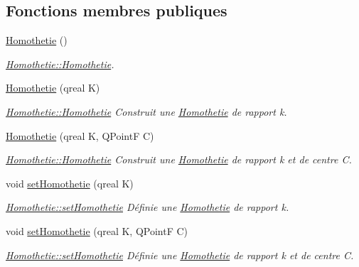 \subsection*{Fonctions membres publiques}
\begin{DoxyCompactItemize}
\item 
\hyperlink{class_homothetie_a0c2ab7e4afc80bf76f10d6cecc2891fe}{Homothetie} ()
\begin{DoxyCompactList}\small\item\em \hyperlink{class_homothetie_a0c2ab7e4afc80bf76f10d6cecc2891fe}{Homothetie\+::\+Homothetie}. \end{DoxyCompactList}\item 
\hyperlink{class_homothetie_ab9e23a5bfa3141fde6951a4eec5cbe6e}{Homothetie} (qreal K)
\begin{DoxyCompactList}\small\item\em \hyperlink{class_homothetie_a0c2ab7e4afc80bf76f10d6cecc2891fe}{Homothetie\+::\+Homothetie} Construit une \hyperlink{class_homothetie}{Homothetie} de rapport k. \end{DoxyCompactList}\item 
\hyperlink{class_homothetie_a18b4271dabd8771540007efe8389827a}{Homothetie} (qreal K, Q\+Point\+F C)
\begin{DoxyCompactList}\small\item\em \hyperlink{class_homothetie_a0c2ab7e4afc80bf76f10d6cecc2891fe}{Homothetie\+::\+Homothetie} Construit une \hyperlink{class_homothetie}{Homothetie} de rapport k et de centre C. \end{DoxyCompactList}\item 
void \hyperlink{class_homothetie_aa522cc6acd7c5822a67dde17e406da3c}{set\+Homothetie} (qreal K)
\begin{DoxyCompactList}\small\item\em \hyperlink{class_homothetie_aa522cc6acd7c5822a67dde17e406da3c}{Homothetie\+::set\+Homothetie} Définie une \hyperlink{class_homothetie}{Homothetie} de rapport k. \end{DoxyCompactList}\item 
void \hyperlink{class_homothetie_a759ed4ea817426a6f9aff78986b78bd1}{set\+Homothetie} (qreal K, Q\+Point\+F C)
\begin{DoxyCompactList}\small\item\em \hyperlink{class_homothetie_aa522cc6acd7c5822a67dde17e406da3c}{Homothetie\+::set\+Homothetie} Définie une \hyperlink{class_homothetie}{Homothetie} de rapport k et de centre C. \end{DoxyCompactList}\end{DoxyCompactItemize}

